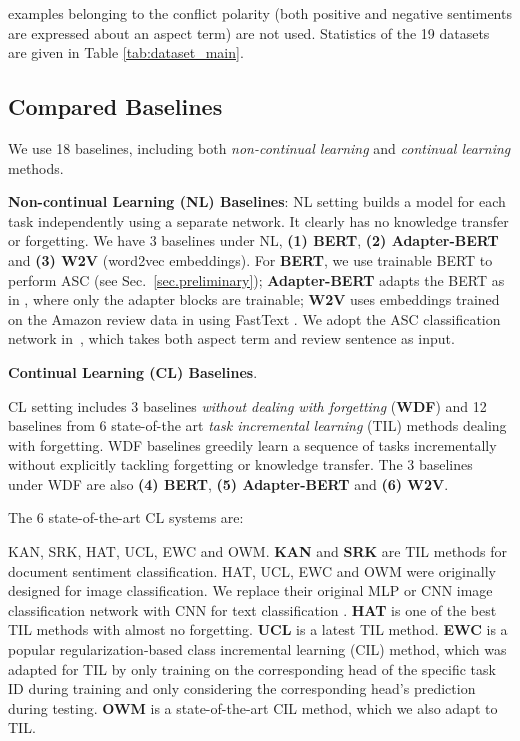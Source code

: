 \documentclass[11pt]{article}
\begin{document}
examples belonging to the conflict polarity (both positive and negative sentiments are expressed about an aspect term) are not used.
Statistics of the 19 datasets are given in Table \ref{tab:dataset_main}.


\subsection{Compared Baselines}
\label{sec:baselines}

We use 18 baselines, including both \textit{non-continual learning} and \textit{continual learning} methods. 

\textbf{Non-continual Learning (NL) Baselines}: NL setting builds a model for each task independently using a separate network. It clearly has no knowledge transfer or forgetting. We have 3 baselines under NL, \textbf{(1) BERT}, \textbf{(2) Adapter-BERT} and \textbf{(3) W2V} (word2vec embeddings). For \textbf{BERT}, we use trainable BERT to perform ASC (see Sec.~\ref{sec.preliminary}); \textbf{Adapter-BERT} adapts the BERT as in \cite{DBLP:conf/icml/HoulsbyGJMLGAG19}, where only the adapter blocks are trainable; \textbf{W2V} uses embeddings 
trained on the Amazon review data in \cite{Xu2018pro} using FastText \cite{grave2018learning}. We adopt the ASC classification network in~\cite{DBLP:conf/acl/LiX18}, which takes both aspect term and review sentence as input. 

\textbf{Continual Learning (CL) Baselines}. {\color{black}CL setting includes 3 baselines \textit{without dealing with forgetting} (\textbf{WDF}) and 12 baselines from 6 state-of-the art \textit{task incremental learning} (TIL) methods dealing with forgetting. WDF baselines 
greedily learn a sequence of tasks incrementally without explicitly tackling forgetting or knowledge transfer. The 3 baselines under WDF are also \textbf{(4) BERT}, \textbf{(5) Adapter-BERT} and \textbf{(6) W2V}.

The 6 state-of-the-art CL systems are:} KAN, SRK, HAT, UCL, EWC and OWM. \textbf{KAN} \citep{ke2020continual} and \textbf{SRK} \citep{DBLP:conf/dasfaa/LvWLCZ19} are  TIL methods for document sentiment classification. HAT, UCL, EWC and OWM were originally designed for image classification. We replace their original MLP or CNN image classification network with CNN for text classification \cite{DBLP:conf/emnlp/Kim14}. 
\textbf{HAT} 
\citep{Serra2018overcoming} is one of the best TIL methods with almost no forgetting. 
\textbf{UCL}
\citep{DBLP:conf/nips/AhnCLM19} is a latest TIL method. \textbf{EWC} \citep{Kirkpatrick2017overcoming} is a popular regularization-based class incremental learning (CIL) method, which was adapted for TIL by only training on the corresponding head of the specific task ID during training and only considering the corresponding head's prediction during testing.
\textbf{OWM} \citep{zeng2019continuous} is a state-of-the-art CIL method, which we also adapt to TIL. 
\end{document}
